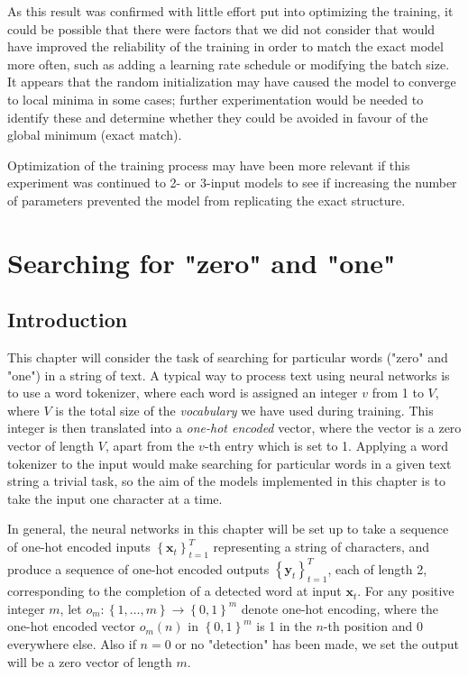 \documentclass{somasmsc}
\begin{document}
As this result was confirmed with little effort put into optimizing the training, it could be possible that there were factors that we did not consider that would have improved the reliability of the training in order to match the exact model more often, such as adding a learning rate schedule or modifying the batch size. It appears that the random initialization may have caused the model to converge to local minima in some cases; further experimentation would be needed to identify these and determine whether they could be avoided in favour of the global minimum (exact match).

Optimization of the training process may have been more relevant if this experiment was continued to 2- or 3-input models to see if increasing the number of parameters prevented the model from replicating the exact structure.




\chapter{Searching for "zero" and "one"}

\section{Introduction}

This chapter will consider the task of searching for particular words ("zero" and "one") in a string of text. A typical way to process text using neural networks is to use a word tokenizer, where each word is assigned an integer $v$ from 1 to $V$, where $V$ is the total size of the \textit{vocabulary} we have used during training. This integer is then translated into a \textit{one-hot encoded} vector, where the vector is a zero vector of length $V$, apart from the $v$-th entry which is set to 1. Applying a word tokenizer to the input would make searching for particular words in a given text string a trivial task, so the aim of the models implemented in this chapter is to take the input one character at a time.

In general, the neural networks in this chapter will be set up to take a sequence of one-hot encoded inputs $\left\{\pmb{x}_t\right\}_{t=1}^T$ representing a string of characters, and produce a sequence of one-hot encoded outputs $\left\{\pmb{y}_t\right\}_{t=1}^T$, each of length 2, corresponding to the completion of a detected word at input $\pmb{x}_t$. For any positive integer $m$, let $o_m: \left\{1, \dots, m\right\} \rightarrow \left\{0, 1\right\}^m$ denote one-hot encoding, where the one-hot encoded vector $o_m(n)$ in $\left\{0,1\right\}^m$ is 1 in the $n$-th position and 0 everywhere else. Also if $n=0$ or no "detection" has been made, we set the output will be a zero vector of length $m$.
\end{document}
